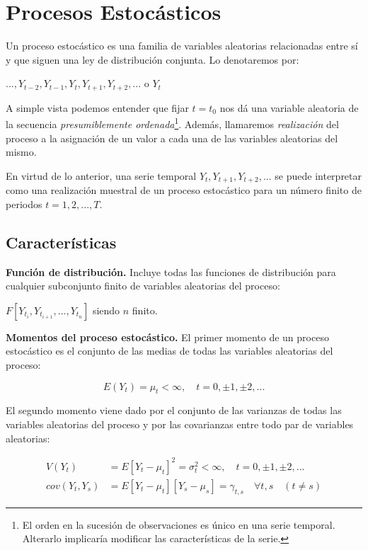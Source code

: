 \documentclass[a4paper,10pt]{article}
\begin{document}
\section{Procesos Estocásticos}

Un proceso estocástico es una familia de variables aleatorias relacionadas entre sí y que siguen una ley de distribución conjunta. Lo denotaremos por:

\begin{center}
 $...,Y_{t-2},Y_{t-1},Y_t,Y_{t+1},Y_{t+2},...$ o $Y_t$
\end{center}

A simple vista podemos entender que fijar $t=t_0$ nos dá una variable aleatoria de la secuencia \textit{presumiblemente ordenada}\footnote{El orden en la sucesión de observaciones es único en una serie temporal. Alterarlo implicaría modificar las características de la serie.}. Además, llamaremos \textit{realización} del proceso a la asignación de un valor a cada una de las variables aleatorias del mismo.

En virtud de lo anterior, una serie temporal $Y_t, Y_{t+1},Y_{t+2},...$ se puede interpretar como una realización muestral de un proceso estocástico para un número finito de periodos $t=1,2,...,T$.

\subsection{Características}

\textbf{Función de distribución.} Incluye todas las funciones de distribución para cualquier subconjunto finito de variables aleatorias del proceso:

\begin{center}
$F[Y_{t_i}, Y_{t_{i+1}},...,Y_{t_n}]$ siendo $n$ finito.
\end{center}

\textbf{Momentos del proceso estocástico.} El primer momento de un proceso estocástico es el conjunto de las medias de todas las variables aleatorias del proceso:

\begin{equation}
E(Y_t) = \mu_t < \infty, \quad t = 0, \pm 1, \pm 2, ...
\end{equation}

El segundo momento viene dado por el conjunto de las varianzas de todas las variables aleatorias del proceso y por las covarianzas entre todo par de variables aleatorias:

\begin{equation}
\begin{split}
V(Y_t) & = E[Y_t - \mu_t]^2 = \sigma_t^2 < \infty, \quad t=0, \pm 1, \pm 2, ... \\
cov(Y_t,Y_s) & = E[Y_t - \mu_t][Y_s - \mu_s] = \gamma_{t,s} \quad \forall t,s \quad (t \neq s)
\end{split}
\end{equation}
\end{document}
